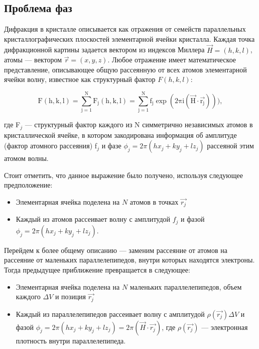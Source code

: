 \subsection{Проблема фаз}

Дифракция в кристалле описывается как отражения от семейств параллельных кристаллографических плоскостей элементарной ячейки кристалла. Каждая точка дифракционной картины задается вектором из индексов Миллера $\overrightarrow{H} = (h,k,l)$, атомы --- вектором $\overrightarrow{r} = (x,y,z)$. Любое отражение имеет математическое представление, описывающее общую рассеянную от всех атомов элементарной ячейки волну, известное как структурный фактор $F(h,k,l)$:

\begin{equation}\label{eq1}
\mathrm{ 
F(h,k,l) = \sum\limits_{j=1}^N F_j (h,k,l) = \sum\limits_{j=1}^N f_j \exp(2\pi i(\overrightarrow{H}\cdot\overrightarrow{r_j}))),}
\end{equation}

где F$_j$ --- структурный фактор каждого из N симметрично независимых атомов в кристаллической ячейке, в котором закодирована информация об амплитуде (фактор атомного рассеяния) f$_j$ и фазе $\phi_j = 2\pi (hx_j+ky_j+lz_j)$ рассеяной этим атомом волны.

Стоит отметить, что данное выражение было получено, используя следующее предположение:

\begin{itemize}
\item Элементарная ячейка поделена на $N$ атомов в точках $\overrightarrow{r_j}$

\item Каждый из атомов рассеивает волну с амплитудой $f_j$  и фазой $\phi_j = 2\pi (hx_j+ky_j+lz_j)$.
\end{itemize}

Перейдем к более общему описанию --- заменим рассеяние от атомов на рассеяние от маленьких параллелепипедов, внутри которых находятся электроны. Тогда предыдущее приближение превращается в следующее:

\begin{itemize}
\item Элементарная ячейка поделена на $N$ маленьких параллелепипедов, объем каждого $\Delta V$ и позиция $\overrightarrow{r_j}$

\item Каждый из параллелепипедов рассеивает волну с амплитудой $\rho(\overrightarrow{r_j})\Delta V$  и фазой $\phi_j = 2\pi (hx_j+ky_j+lz_j) = 2\pi (\overrightarrow{H}\cdot\overrightarrow{r_j})$, где $\rho(\overrightarrow{r_j})$ --- электронная плотность внутри параллелепипеда.
\end{itemize}

